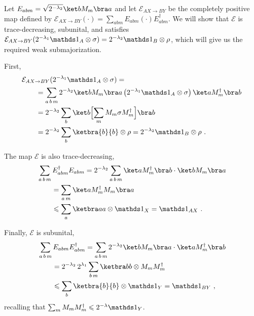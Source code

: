 \documentclass[12pt,a4paper]{article}
\newenvironment{myproof}[1][\proofname]{%
  \color{prooftextcolor} \footnotesize \proof[\itshape #1]\hspace*{1.2mm}%
}{\endproof}
\begin{document}
\begin{myproof}[Proof of Prop.~\ref{prop:LambdaMajorizationTMap}]
  Let $E_{abm} = \sqrt{2^{-\lambda_2}} \ket b M_m \bra a$ and let $\mathcal{E}_{AX\rightarrow BY}$ be the
  completely positive map defined by $\mathcal{E}_{AX\rightarrow BY}(\cdot) =
  \sum_{abm} E_{abm}\left(\cdot\right)E_{abm}^\dagger$. We will show that $\mathcal{E}$ is trace-decreasing,
  subunital, and satisfies $\mathcal{E}_{AX\rightarrow BY}(2^{-\lambda_1}\Ident_A\otimes\sigma) =
  2^{-\lambda_2}\Ident_B\otimes\rho$,
  which will give us the required weak submajorization.
  
  First,
  \begin{align*}
    &\mathcal{E}_{AX\rightarrow BY}(2^{-\lambda_1}\Ident_A\otimes\sigma) = \\
    &\qquad = \sum_{a\,b\,m} 2^{-\lambda_2} \ket b M_m \bra a \left(2^{-\lambda_1}\Ident_A\otimes\sigma\right)
    \ket a M_m^\dagger \bra b \\
    &\qquad = 2^{-\lambda_2} \sum_{b} \ket b \Bigl[\sum_m M_m \sigma M_m^\dagger \Bigr] \bra b \\
    &\qquad = 2^{-\lambda_2} \sum_b \ketbra{b}{b}\otimes \rho  = 2^{-\lambda_2}\Ident_B\otimes\rho\ .
  \end{align*}

  The map $\mathcal{E}$ is also trace-decreasing,
  \begin{align*}
    &\sum_{a\,b\,m} E_{abm}^\dagger E_{abm} = 2^{-\lambda_2} \sum_{a\,b\,m} \ket a M_m^\dagger \bra b\cdot
    \ket b M_m \bra a \\
    &\qquad = \sum_{a\,m} \ket a M_m^\dagger M_m \bra a \\
    &\qquad \leqslant \sum_a \ketbra aa \otimes \Ident_X
    = \Ident_{AX}\ .
  \end{align*}

  Finally, $\mathcal{E}$ is subunital,
  \begin{align*}
    &\sum_{a\,b\,m} E_{abm} E_{abm}^\dagger
    = \sum_{a\,b\,m} 2^{-\lambda_2} \ket b M_m \bra a \cdot \ket a M_m^\dagger \bra b \\
    &\qquad = 2^{-\lambda_2}\,2^{\lambda_1} \sum_{b\,m} \ketbra bb \otimes M_m M_m^\dagger \\
    &\qquad \leqslant \sum_b \ketbra{b}{b}\otimes \Ident_Y = \Ident_{BY}\ ,
  \end{align*}
  recalling that $\sum_m M_m M_m^\dagger \leqslant 2^{-\lambda}\Ident_Y$.
\end{myproof}


%
%


\end{document}
